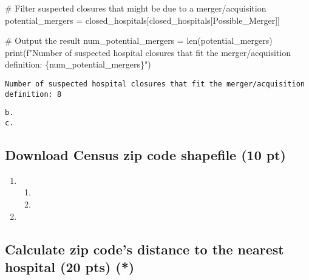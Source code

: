 \documentclass[
  letterpaper,
  DIV=11,
  numbers=noendperiod]{scrartcl}
\newenvironment{Shaded}{\begin{snugshade}}{\end{snugshade}}
\newcommand{\BuiltInTok}[1]{\textcolor[rgb]{0.00,0.23,0.31}{#1}}
\newcommand{\CommentTok}[1]{\textcolor[rgb]{0.37,0.37,0.37}{#1}}
\newcommand{\NormalTok}[1]{\textcolor[rgb]{0.00,0.23,0.31}{#1}}
\newcommand{\OperatorTok}[1]{\textcolor[rgb]{0.37,0.37,0.37}{#1}}
\newcommand{\SpecialCharTok}[1]{\textcolor[rgb]{0.37,0.37,0.37}{#1}}
\newcommand{\SpecialStringTok}[1]{\textcolor[rgb]{0.13,0.47,0.30}{#1}}
\newcommand{\StringTok}[1]{\textcolor[rgb]{0.13,0.47,0.30}{#1}}
\providecommand{\tightlist}{%
  \setlength{\itemsep}{0pt}\setlength{\parskip}{0pt}}\usepackage{longtable,booktabs,array}
\begin{document}
\begin{Shaded}
\begin{Highlighting}[]
\CommentTok{\# Filter suspected closures that might be due to a merger/acquisition}
\NormalTok{potential\_mergers }\OperatorTok{=}\NormalTok{ closed\_hospitals[closed\_hospitals[}\StringTok{\textquotesingle{}Possible\_Merger\textquotesingle{}}\NormalTok{]]}

\CommentTok{\# Output the result}
\NormalTok{num\_potential\_mergers }\OperatorTok{=} \BuiltInTok{len}\NormalTok{(potential\_mergers)}
\BuiltInTok{print}\NormalTok{(}\SpecialStringTok{f"Number of suspected hospital closures that fit the merger/acquisition definition: }\SpecialCharTok{\{}\NormalTok{num\_potential\_mergers}\SpecialCharTok{\}}\SpecialStringTok{"}\NormalTok{)}
\end{Highlighting}
\end{Shaded}

\begin{verbatim}
Number of suspected hospital closures that fit the merger/acquisition definition: 8
\end{verbatim}

\begin{verbatim}
b.
c.
\end{verbatim}

\subsection{Download Census zip code shapefile (10
pt)}\label{download-census-zip-code-shapefile-10-pt}

\begin{enumerate}
\def\labelenumi{\arabic{enumi}.}
\tightlist
\item
  \begin{enumerate}
  \def\labelenumii{\alph{enumii}.}
  \tightlist
  \item
  \item
  \end{enumerate}
\item
\end{enumerate}

\subsection{Calculate zip code's distance to the nearest hospital (20
pts)
(*)}\label{calculate-zip-codes-distance-to-the-nearest-hospital-20-pts}
\end{document}

